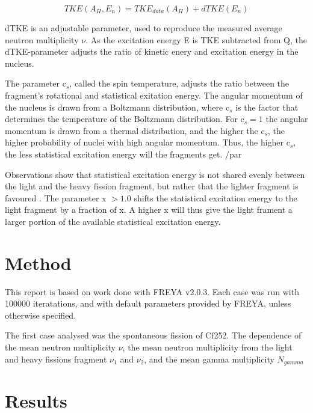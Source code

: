 \documentclass[]{article}
\begin{document}
\begin{equation}
	\label{eq:total_kinetiv_energy}
	TKE(A_H, E_n) = TKE_{data}(A_H) + dTKE(E_n)
\end{equation}

dTKE is an adjustable parameter, used to reproduce the measured average neutron multiplicity $\nu$. As the excitation energy E is TKE subtracted from Q, the dTKE-parameter adjusts the ratio of kinetic enery and excitation energy in the nucleus. \par 
\vspace{3mm}

The parameter c$_s$, called the spin temperature, adjusts the ratio between the fragment's rotational and statistical exitation energy. The angular momentum of the nucleus is drawn from a Boltzmann distribution, where c$_s$ is the factor that determines the temperature of the Boltzmann distribution. For c$_s = 1$ the angular momentum is drawn from a thermal distribution, and the higher the c$_s$, the higher probability of nuclei with high angular momentum. Thus, the higher c$_s$, the less statistical excitation energy will the fragments get. /par 

\vspace{3mm}

Observations show that statistical excitation energy is not shared evenly between the light and the heavy fission fragment, but rather that the lighter fragment is favoured \cite{FREYAusemanual}. The parameter x $>1.0$ shifts the statistical excitation energy to the light fragment by a fraction of x. A higher x will thus give the light frament a larger portion of the available statistical excitation energy.

\section{Method}

This report is based on work done with FREYA v2.0.3. Each case was run with 100000 iteratations, and with default parameters provided by FREYA, unless otherwise specified. 

The first case analysed was the spontaneous fission of Cf252. The dependence of the mean neutron multiplicity $\nu$, the mean neutron multiplicity from the light  and heavy fissions fragment $\nu_1$ and $\nu_2$, and the mean gamma multiplicity $N_{gamma}$

\section{Results}
\end{document}
